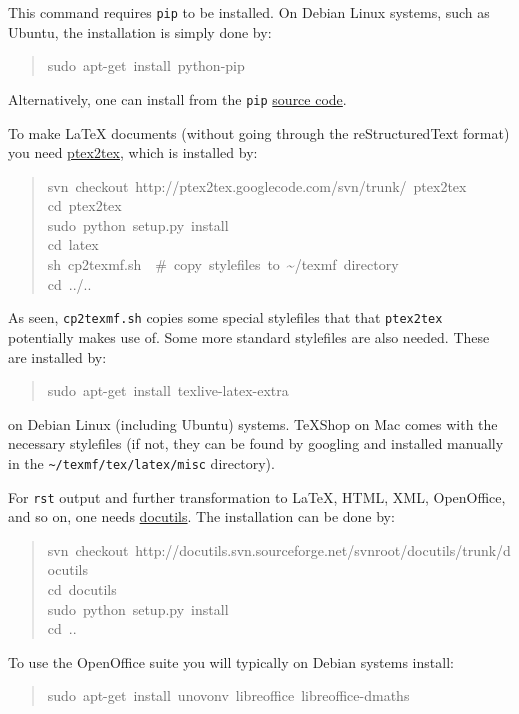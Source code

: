 \documentclass[a4paper]{article}
\begin{document}
This command requires \texttt{pip} to be installed. On Debian Linux systems,
such as Ubuntu, the installation is simply done by:
%
\begin{quote}{\ttfamily \raggedright \noindent
sudo~apt-get~install~python-pip
}
\end{quote}

Alternatively, one can install from the \texttt{pip} \href{http://pypi.python.org/pypi/pip}{source code}.

To make LaTeX
documents (without going through the reStructuredText format) you
need \href{http://code.google.com/p/ptex2tex}{ptex2tex}, which is
installed by:
%
\begin{quote}{\ttfamily \raggedright \noindent
svn~checkout~http://ptex2tex.googlecode.com/svn/trunk/~ptex2tex\\
cd~ptex2tex\\
sudo~python~setup.py~install\\
cd~latex\\
sh~cp2texmf.sh~~\#~copy~stylefiles~to~\textasciitilde{}/texmf~directory\\
cd~../..
}
\end{quote}

As seen, \texttt{cp2texmf.sh} copies some special stylefiles that
that \texttt{ptex2tex} potentially makes use of. Some more standard stylefiles
are also needed. These are installed by:
%
\begin{quote}{\ttfamily \raggedright \noindent
sudo~apt-get~install~texlive-latex-extra
}
\end{quote}

on Debian Linux (including Ubuntu) systems. TeXShop on Mac comes with
the necessary stylefiles (if not, they can be found by googling and installed
manually in the \texttt{\textasciitilde{}/texmf/tex/latex/misc} directory).

For \texttt{rst} output and further transformation to LaTeX, HTML, XML,
OpenOffice, and so on, one needs \href{http://docutils.sourceforge.net}{docutils}.
The installation can be done by:
%
\begin{quote}{\ttfamily \raggedright \noindent
svn~checkout~http://docutils.svn.sourceforge.net/svnroot/docutils/trunk/docutils\\
cd~docutils\\
sudo~python~setup.py~install\\
cd~..
}
\end{quote}

To use the OpenOffice suite you will typically on Debian systems install:
%
\begin{quote}{\ttfamily \raggedright \noindent
sudo~apt-get~install~unovonv~libreoffice~libreoffice-dmaths
}
\end{quote}
\end{document}
